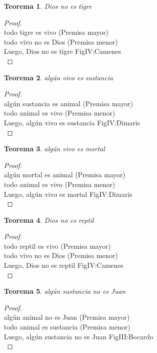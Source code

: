 ﻿\documentclass[12pt]{book}
\newtheorem{theorem}{Teorema}[chapter]
\newtheorem{proof}{Demostración}
\begin{document}
\begin{theorem}
Dios no es tigre
\label{th: 76}
\end{theorem}\begin{proof}\\todo tigre es vivo	 (Premisa mayor) \\todo vivo no es Dios	 (Premisa menor) \\Luego, Dios no es tigre	FigIV:Camenes \\ \end{proof}
\begin{theorem}
algún vivo es sustancia
\label{th: 77}
\end{theorem}\begin{proof}\\algún sustancia es animal	 (Premisa mayor) \\todo animal es vivo	 (Premisa menor) \\Luego, algún vivo es sustancia	FigIV:Dimaris \\ \end{proof}
\begin{theorem}
algún vivo es mortal
\label{th: 78}
\end{theorem}\begin{proof}\\algún mortal es animal	 (Premisa mayor) \\todo animal es vivo	 (Premisa menor) \\Luego, algún vivo es mortal	FigIV:Dimaris \\ \end{proof}
\begin{theorem}
Dios no es reptil
\label{th: 79}
\end{theorem}\begin{proof}\\todo reptil es vivo	 (Premisa mayor) \\todo vivo no es Dios	 (Premisa menor) \\Luego, Dios no es reptil	FigIV:Camenes \\ \end{proof}
\begin{theorem}
algún sustancia no es Juan
\label{th: 80}
\end{theorem}\begin{proof}\\algún animal no es Juan	 (Premisa mayor) \\todo animal es sustancia	 (Premisa menor) \\Luego, algún sustancia no es Juan	FigIII:Bocardo \\ \end{proof}
\end{document}
